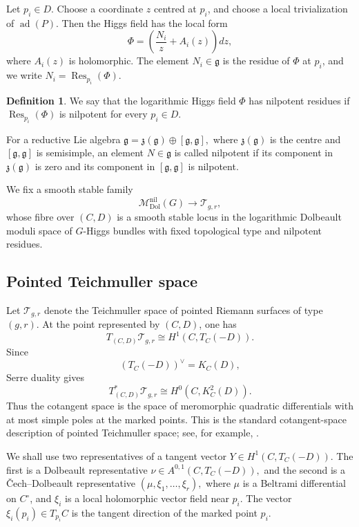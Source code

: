 \documentclass[11pt,reqno]{amsart}
\numberwithin{equation}{section}
\theoremstyle{plain}
\theoremstyle{definition}
\newtheorem{definition}[theorem]{Definition}
\theoremstyle{remark}
\begin{document}
Let \(p_i\in D\). Choose a coordinate \(z\) centred at \(p_i\), and choose a
local trivialization of \(\operatorname{ad}(P)\). Then the Higgs field has the
local form
\[
        \Phi=
        \left(
        \frac{N_i}{z}+A_i(z)
        \right)dz,
\]
where \(A_i(z)\) is holomorphic. The element
\(
        N_i\in\mathfrak g
\)
is the residue of \(\Phi\) at \(p_i\), and we write
\(
        N_i=\operatorname{Res}_{p_i}(\Phi).
\)

\begin{definition}
We say that the logarithmic Higgs field \(\Phi\) has nilpotent residues if
\(
        \operatorname{Res}_{p_i}(\Phi)
\)
is nilpotent for every \(p_i\in D\).
\end{definition}

For a reductive Lie algebra
\(
        \mathfrak g
        =
        \mathfrak z(\mathfrak g)\oplus[\mathfrak g,\mathfrak g],
\)
where \(\mathfrak z(\mathfrak g)\) is the centre and
\([\mathfrak g,\mathfrak g]\) is semisimple, an element
\(
        N\in\mathfrak g
\)
is called nilpotent if its component in \(\mathfrak z(\mathfrak g)\) is zero
and its component in \([\mathfrak g,\mathfrak g]\) is nilpotent.

We fix a smooth stable family
\[
        \mathcal M^{\mathrm{nil}}_{\mathrm{Dol}}(G)
        \longrightarrow
        \mathcal T_{g,r},
\]
whose fibre over \((C,D)\) is a smooth stable locus in the logarithmic Dolbeault
moduli space of \(G\)-Higgs bundles with fixed topological type and nilpotent
residues.

\subsection{Pointed Teichmuller space}

Let \(\mathcal T_{g,r}\) denote the Teichmuller space of pointed Riemann
surfaces of type \((g,r)\).  At the point represented by \((C,D)\), one has
\[
        T_{(C,D)}\mathcal T_{g,r}
        \cong
        H^1(C,T_C(-D)).
\]
Since
\[
        (T_C(-D))^\vee=K_C(D),
\]
Serre duality gives
\[
        T^*_{(C,D)}\mathcal T_{g,r}
        \cong
        H^0(C,K_C^2(D)).
\]
Thus the cotangent space is the space of meromorphic quadratic differentials
with at most simple poles at the marked points.
This is the standard cotangent-space description of pointed Teichmuller space;
see, for example, \cite{Gardiner,Hubbard}.

We shall use two representatives of a tangent vector
\(
        Y\in H^1(C,T_C(-D)).
\)
The first is a Dolbeault representative
\(
        \nu\in A^{0,1}(C,T_C(-D)),
\)
and the second is a \v{C}ech--Dolbeault representative
\(
        (\mu,\xi_1,\ldots,\xi_r),
\)
where \(\mu\) is a Beltrami differential on \(C^\circ\), and \(\xi_i\) is a
local holomorphic vector field near \(p_i\).  The vector
\(
        \xi_i(p_i)\in T_{p_i}C
\)
is the tangent direction of the marked point \(p_i\).
\end{document}
